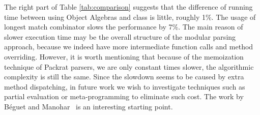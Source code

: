 The right part of Table \ref{tab:comparison} suggests that the difference of running time between
using Object Algebras and class is little, roughly 1\%.
The usage of longest match combinator slows the performance by 7\%. The main reason of slower
execution time may be the overall structure of the modular parsing approach, because we indeed have
more intermediate function calls and method overriding. However, it is worth mentioning that
because of the memoization technique of Packrat parsers, we are only constant times
slower, the algorithmic complexity is still the same.
Since the slowdown seems to be caused by extra method
dispatching, in future work we wish to investigate techniques such as 
partial evaluation or meta-programming to eliminate such cost. The
work by B{\'e}guet and Manohar~\cite{Beguet:2014} is an interesting starting point.
